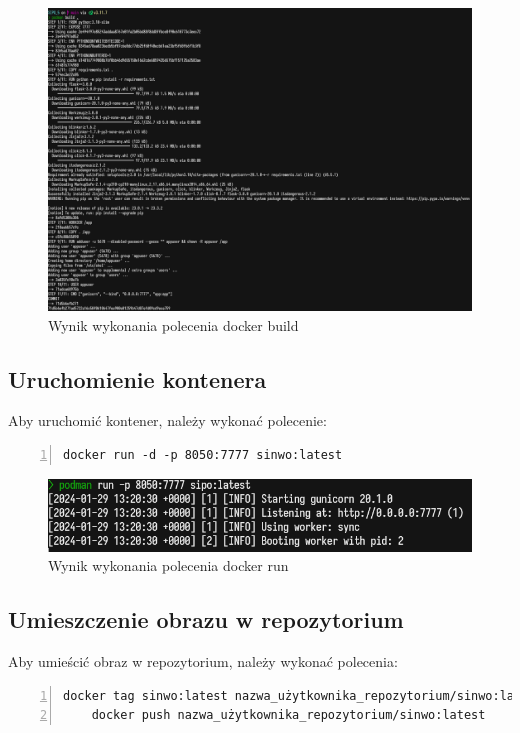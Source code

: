 \documentclass[a4paper,12pt]{article}
\begin{document}
\begin{figure}[ht]
    \includegraphics[width=1\textwidth]{images/docker_build.png}
    \caption{Wynik wykonania polecenia docker build}
\end{figure}
\subsection{Uruchomienie kontenera}
Aby uruchomić kontener, należy wykonać polecenie:
\begin{lstlisting}[breaklines=true, basicstyle=\small, numbers=left]
    docker run -d -p 8050:7777 sinwo:latest
\end{lstlisting}
\begin{figure}
    \includegraphics[width=1\textwidth]{images/docker_run.png}
    \caption{Wynik wykonania polecenia docker run}
\end{figure}
\newpage
\subsection{Umieszczenie obrazu w repozytorium}
Aby umieścić obraz w repozytorium, należy wykonać polecenia:

\begin{lstlisting}[breaklines=true, basicstyle=\small, numbers=left]
    docker tag sinwo:latest nazwa_użytkownika_repozytorium/sinwo:latest
    docker push nazwa_użytkownika_repozytorium/sinwo:latest
\end{lstlisting}
\end{document}
